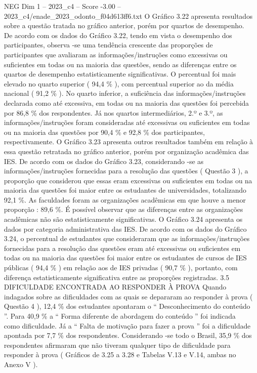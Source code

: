\begin{textsample}{NEG Dim 1 – 2023\_c4 – Score -3.00 – 2023\_c4/enade\_2023\_odonto\_f04d613ff6.txt}
O Gráfico 3.22 apresenta resultados sobre a questão tratada no gráfico anterior, porém por quartos de desempenho.
De acordo com os dados do Gráfico 3.22, tendo em vista o desempenho dos participantes, observa -se uma tendência crescente das proporções de participantes que avaliaram as informações/instruções como excessivas ou suficientes em todas ou na maioria das questões, sendo as diferenças entre os quartos de desempenho estatisticamente significativas.
O percentual foi mais elevado no quarto superior ( 94,4 \% ), com percentual superior ao da média nacional ( 91,2 \% ).
No quarto inferior, a suficiência das informações/instruções declarada como até excessiva, em todas ou na maioria das questões foi percebida por 86,8 \% dos respondentes.
Já nos quartos intermediários, 2.º e 3.º, as informações/instruções foram consideradas até excessivas ou suficientes em todas ou na maioria das questões por 90,4 \% e 92,8 \% dos participantes, respectivamente.
O Gráfico 3.23 apresenta outros resultados também em relação à essa questão retratada no gráfico anterior, porém por organização acadêmica das IES.
De acordo com os dados do Gráfico 3.23, considerando -se as informações/instruções fornecidas para a resolução das questões ( Questão 3 ), a proporção que considerou que essas eram excessivas ou suficientes em todas ou na maioria das questões foi maior entre os estudantes de universidades, totalizando 92,1 \%.
As faculdades foram as organizações acadêmicas em que houve a menor proporção : 89,6 \%.
É possível observar que as diferenças entre as organizações acadêmicas não são estatisticamente significativas.
O Gráfico 3.24 apresenta os dados por categoria administrativa das IES.
De acordo com os dados do Gráfico 3.24, o percentual de estudantes que consideraram que as informações/instruções fornecidas para a resolução das questões eram até excessivas ou suficientes em todas ou na maioria das questões foi maior entre os estudantes de cursos de IES públicas ( 94,4 \% ) em relação aos de IES privadas ( 90,7 \% ), portanto, com diferença estatisticamente significativa entre as proporções registradas. 3.5 DIFICULDADE ENCONTRADA AO RESPONDER À PROVA Quando indagados sobre as dificuldades com as quais se depararam ao responder à prova ( Questão 4 ), 12,4 \% dos estudantes apontaram o “ Desconhecimento do conteúdo ”.
Para 40,9 \% a “ Forma diferente de abordagem do conteúdo ” foi indicada como dificuldade.
Já a “ Falta de motivação para fazer a prova ” foi a dificuldade apontada por 7,7 \% dos respondentes.
Considerando -se todo o Brasil, 35,9 \% dos respondentes afirmaram que não tiveram qualquer tipo de dificuldade para responder à prova ( Gráficos de 3.25 a 3.28 e Tabelas V.13 e V.14, ambas no Anexo V ).

\end{textsample}
